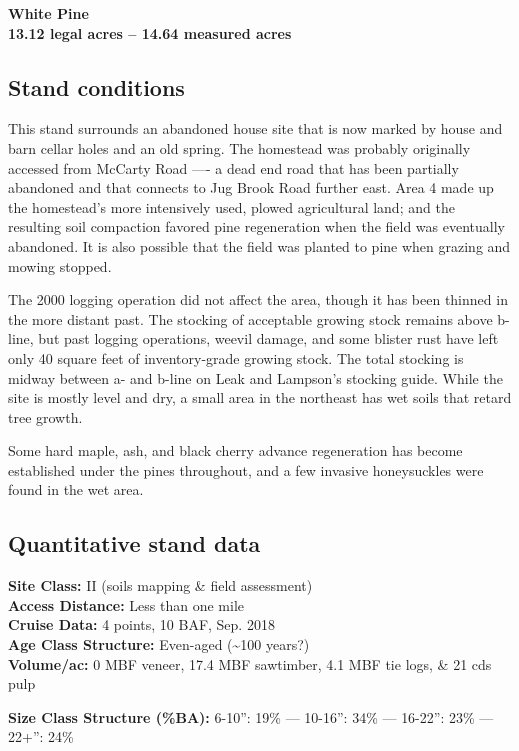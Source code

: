 \documentclass[]{tufte-handout}
\begin{document}
\textbf{White Pine}\\
\textbf{13.12 legal acres -- 14.64 measured acres}

\subsection{Stand conditions}\label{stand-conditions-3}

This stand surrounds an abandoned house site that is now marked by house
and barn cellar holes and an old spring. The homestead was probably
originally accessed from McCarty Road ---- a dead end road that has been
partially abandoned and that connects to Jug Brook Road further east.
Area 4 made up the homestead's more intensively used, plowed
agricultural land; and the resulting soil compaction favored pine
regeneration when the field was eventually abandoned. It is also
possible that the field was planted to pine when grazing and mowing
stopped.

The 2000 logging operation did not affect the area, though it has been
thinned in the more distant past. The stocking of acceptable growing
stock remains above b-line, but past logging operations, weevil damage,
and some blister rust have left only 40 square feet of inventory-grade
growing stock. The total stocking is midway between a- and b-line on
Leak and Lampson's stocking guide. While the site is mostly level and
dry, a small area in the northeast has wet soils that retard tree
growth.

Some hard maple, ash, and black cherry advance regeneration has become
established under the pines throughout, and a few invasive honeysuckles
were found in the wet area.

\subsection{Quantitative stand data}\label{quantitative-stand-data-3}

\textbf{Site Class: } II (soils mapping \& field assessment)\\
\textbf{Access Distance: } Less than one mile\\
\textbf{Cruise Data: } 4 points, 10 BAF, Sep. 2018\\
\textbf{Age Class Structure: } Even-aged (\textasciitilde{}100 years?)\\
\textbf{Volume/ac: } 0 MBF veneer, 17.4 MBF sawtimber, 4.1 MBF tie logs,
\& 21 cds pulp

\textbf{Size Class Structure (\%BA): } 6-10'': 19\% --- 10-16'': 34\%
--- 16-22'': 23\% --- 22+'': 24\%
\end{document}
